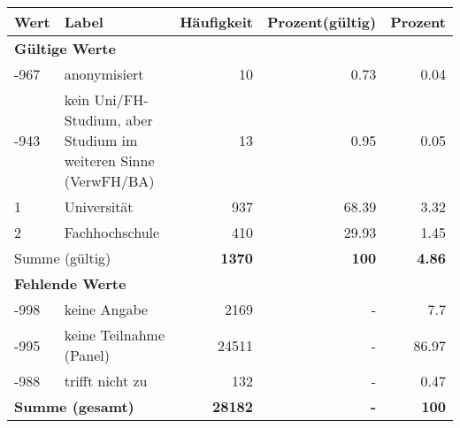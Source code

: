      \begin{longtable}{lXrrr}
     \toprule
     \textbf{Wert} & \textbf{Label} & \textbf{Häufigkeit} & \textbf{Prozent(gültig)} & \textbf{Prozent} \\
     \endhead
     \midrule
     \multicolumn{5}{l}{\textbf{Gültige Werte}}\\

     -967 &
     \multicolumn{1}{X}{ anonymisiert   } &


       \num{10} &
       \num[round-mode=places,round-precision=2]{0,73} &
         \num[round-mode=places,round-precision=2]{0,04} \\

     -943 &
     \multicolumn{1}{X}{ kein Uni/FH-Studium, aber Studium im weiteren Sinne (VerwFH/BA)   } &


       \num{13} &
       \num[round-mode=places,round-precision=2]{0,95} &
         \num[round-mode=places,round-precision=2]{0,05} \\

     1 &
     \multicolumn{1}{X}{ Universität   } &


       \num{937} &
       \num[round-mode=places,round-precision=2]{68,39} &
         \num[round-mode=places,round-precision=2]{3,32} \\

     2 &
     \multicolumn{1}{X}{ Fachhochschule   } &


       \num{410} &
       \num[round-mode=places,round-precision=2]{29,93} &
         \num[round-mode=places,round-precision=2]{1,45} \\
     \midrule
     \multicolumn{2}{l}{Summe (gültig)} &
       \textbf{\num{1370}} &
     \textbf{100} &
       \textbf{\num[round-mode=places,round-precision=2]{4,86}} \\
     \multicolumn{5}{l}{\textbf{Fehlende Werte}}\\
       -998 &
       keine Angabe &
         \num{2169} &
        - &
         \num[round-mode=places,round-precision=2]{7,7} \\
       -995 &
       keine Teilnahme (Panel) &
         \num{24511} &
        - &
         \num[round-mode=places,round-precision=2]{86,97} \\
       -988 &
       trifft nicht zu &
         \num{132} &
        - &
         \num[round-mode=places,round-precision=2]{0,47} \\
     \midrule
     \multicolumn{2}{l}{\textbf{Summe (gesamt)}} &
          \textbf{\num{28182}} &
        \textbf{-} &
        \textbf{100} \\
     \bottomrule
     \end{longtable}
     
